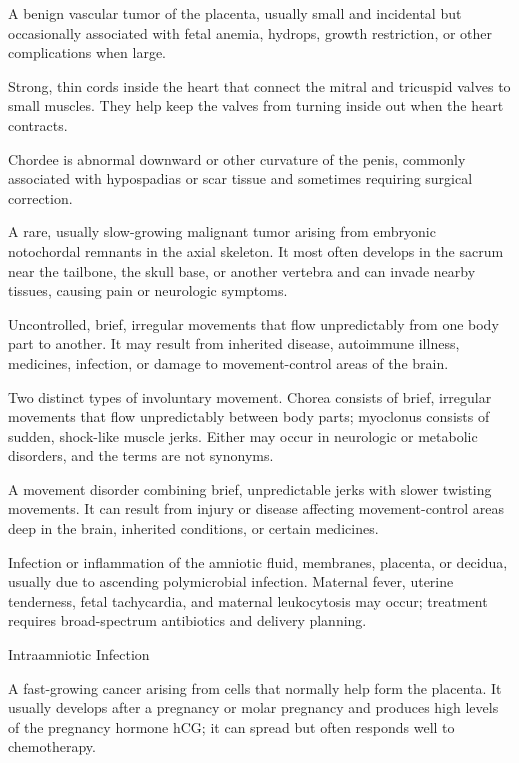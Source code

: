  A benign vascular tumor of the placenta, usually small and incidental but occasionally associated with fetal anemia, hydrops, growth restriction, or other complications when large.

 Strong, thin cords inside the heart that connect the mitral and tricuspid valves to small muscles. They help keep the valves from turning inside out when the heart contracts.

 Chordee is abnormal downward or other curvature of the penis, commonly associated with hypospadias or scar tissue and sometimes requiring surgical correction.

 A rare, usually slow-growing malignant tumor arising from embryonic notochordal remnants in the axial skeleton. It most often develops in the sacrum near the tailbone, the skull base, or another vertebra and can invade nearby tissues, causing pain or neurologic symptoms.

 Uncontrolled, brief, irregular movements that flow unpredictably from one body part to another. It may result from inherited disease, autoimmune illness, medicines, infection, or damage to movement-control areas of the brain.

 Two distinct types of involuntary movement.
Chorea consists of brief, irregular movements that flow unpredictably between
body parts; myoclonus consists of sudden, shock-like muscle jerks. Either may
occur in neurologic or metabolic disorders, and the terms are not synonyms.

 A movement disorder combining brief, unpredictable jerks with slower twisting movements. It can result from injury or disease affecting movement-control areas deep in the brain, inherited conditions, or certain medicines.

 Infection or inflammation of the amniotic fluid, membranes, placenta, or decidua,
usually due to ascending polymicrobial infection. Maternal fever, uterine tenderness,
fetal tachycardia, and maternal leukocytosis may occur; treatment requires
broad-spectrum antibiotics and delivery planning.

\synonyms
Intraamniotic Infection

 A fast-growing cancer arising from cells that normally help form the placenta. It usually develops after a pregnancy or molar pregnancy and produces high levels of the pregnancy hormone hCG; it can spread but often responds well to chemotherapy.


